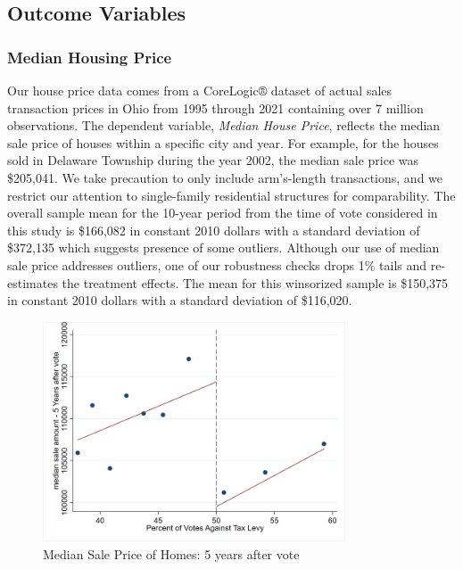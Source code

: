 \subsection{Outcome Variables}


\subsubsection{Median Housing Price}

Our house price data comes from a CoreLogic® dataset of actual sales transaction prices in Ohio from 1995 through 2021 containing over 7 million observations. The dependent variable, \textit{Median House Price}, reflects the median sale price of houses within a specific city and year. For example, for the houses sold in Delaware Township during the year 2002, the median sale price was \$205,041. We take precaution to only include arm’s-length transactions, and we restrict our attention to single-family residential structures for comparability.  The overall sample mean for the 10-year period from the time of vote considered in this study is \$166,082 in constant 2010 dollars with a standard deviation of \$372,135 which suggests presence of some outliers. Although our use of median sale price addresses outliers, one of our robustness checks drops 1\% tails and re-estimates the treatment effects.  The mean for this winsorized sample is \$150,375 in constant 2010 dollars with a standard deviation of \$116,020. 

\begin{figure}[ht]
    \centering
    \includegraphics[width=0.8\textwidth,keepaspectratio]{images/rd_plot_year_5_after_vote.png}
    \caption{Median Sale Price of Homes: 5 years after vote}
    \label{fig:hp_year5_after}
\end{figure}

